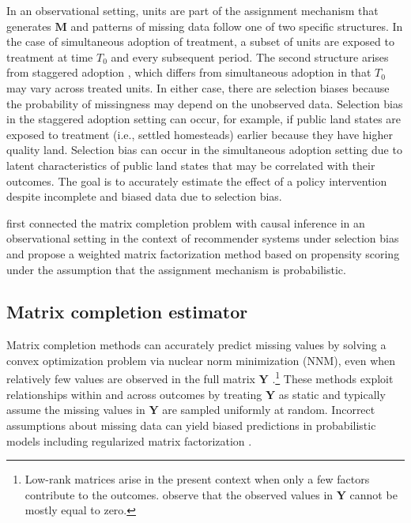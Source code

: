 \documentclass[12pt]{article}
\begin{document}
In an observational setting, units are part of the assignment mechanism that generates $\mathbf{M}$ and patterns of missing data follow one of two specific structures. In the case of simultaneous adoption of treatment, a subset of units are exposed to treatment at time $T_0$ and every subsequent period. The second structure arises from staggered adoption \citep{athey2018design}, which differs from simultaneous adoption in that $T_0$ may vary across treated units. In either case, there are selection biases because the probability of missingness may depend on the unobserved data. Selection bias in the staggered adoption setting can occur, for example, if public land states are exposed to treatment (i.e., settled homesteads) earlier because they have higher quality land. Selection bias can occur in the simultaneous adoption setting due to latent characteristics of public land states that may be correlated with their outcomes. The goal is to accurately estimate the effect of a policy intervention despite incomplete and biased data due to selection bias. 

\citet{schnabel2016recommendations} first connected the matrix completion problem with causal inference in an observational setting in the context of recommender systems under selection bias and propose a weighted matrix factorization method based on propensity scoring under the assumption that the assignment mechanism is probabilistic.

\subsection{Matrix completion estimator}

Matrix completion methods can accurately predict missing values by solving a convex optimization problem via nuclear norm minimization (NNM), even when relatively few values are observed in the full matrix $\mathbf{Y}$ \citep[e.g.,][]{candes2009exact,candes2010matrix}.\footnote{Low-rank matrices arise in the present context when only a few factors contribute to the outcomes. \citet{candes2009exact} observe that the observed values in $\mathbf{Y}$ cannot be mostly equal to zero.} These methods exploit relationships within and across outcomes by treating $\mathbf{Y}$ as static and typically assume the missing values in $\mathbf{Y}$ are sampled uniformly at random. Incorrect assumptions about missing data can yield biased predictions in probabilistic models including regularized matrix factorization \citep{marlin2009collaborative}. 
\end{document}
